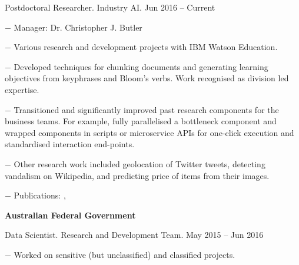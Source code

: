 \documentclass[10pt]{article}
\newcommand{\halfblankline}{\quad\vspace{-0.5\baselineskip}\pagebreak[3]}
\begin{document}
\begin{innerlist}
	\item Postdoctoral Researcher. Industry AI. \hfill {Jun 2016 -- Current}
	\begin{innerlist}
		\item[$-$] Manager: Dr. Christopher J. Butler
		\item[$-$] Various research and development projects with IBM Watson Education.
		\item[$-$] Developed techniques for chunking documents and generating learning objectives from keyphrases and Bloom's verbs. Work recognised as division led expertise.
		\item[$-$] Transitioned and significantly improved past research components for the business teams. For example, fully parallelised a bottleneck component and wrapped components in scripts or microservice APIs for one-click execution and standardised interaction end-points. %
		\item[$-$] Other research work included geolocation of Twitter tweets, detecting vandalism on Wikipedia, and predicting price of items from their images.
		\item[$-$] Publications: \cite{Lau2017}, \cite{Tran2018}
    \end{innerlist}
\end{innerlist}

\halfblankline

\halfblankline

\textbf{Australian Federal Government}

\halfblankline

\begin{innerlist}
	\item Data Scientist. Research and Development Team. \hfill {May 2015 -- Jun 2016}
	\begin{innerlist}
		\item[$-$] Worked on sensitive (but unclassified) and classified projects.
    \end{innerlist}
\end{innerlist}
\end{document}
